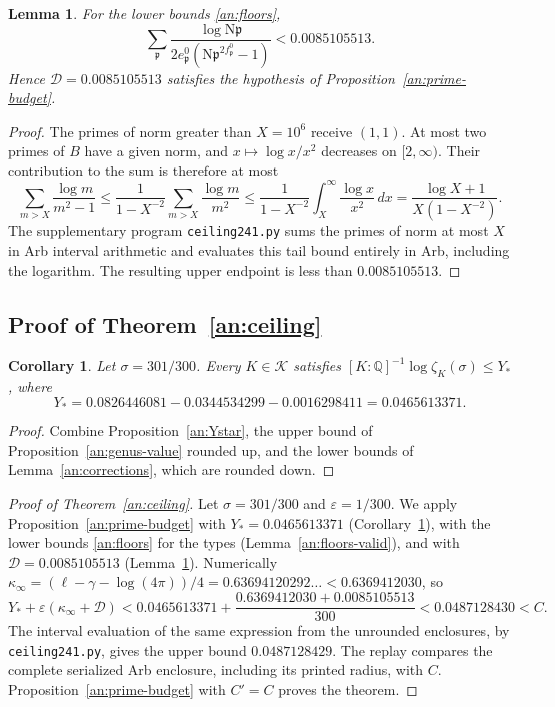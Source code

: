 \documentclass[11pt]{amsart}
\numberwithin{equation}{section}
\newtheorem{lemma}[equation]{Lemma}
\newtheorem{corollary}[equation]{Corollary}
\theoremstyle{definition}
\theoremstyle{remark}
\newcommand{\Q}{\mathbb Q}
\begin{document}
\begin{lemma}\label{an:D}
For the lower bounds \eqref{an:floors},
\begin{equation}\label{an:R}
 \sum_{\mathfrak p}\frac{\log\mathrm N\mathfrak p}
 {2e^0_{\mathfrak p}(\mathrm N\mathfrak p^{2f^0_{\mathfrak p}}-1)}
 <0.0085105513.
\end{equation}
Hence $\mathcal D=0.0085105513$ satisfies the hypothesis of
Proposition~\ref{an:prime-budget}.
\end{lemma}

\begin{proof}
The primes of norm greater than $X=10^6$ receive $(1,1)$. At most two primes
of $B$ have a given norm, and $x\mapsto\log x/x^2$ decreases on
$[2,\infty)$. Their contribution to the sum is therefore at most
\[
 \sum_{m>X}\frac{\log m}{m^2-1}
 \le\frac{1}{1-X^{-2}}\sum_{m>X}\frac{\log m}{m^2}
 \le\frac{1}{1-X^{-2}}\int_X^\infty\frac{\log x}{x^2}\,dx
 =\frac{\log X+1}{X(1-X^{-2})}.
\]
The supplementary program \texttt{ceiling241.py} sums the primes of norm at
most $X$ in Arb interval arithmetic and evaluates this tail bound entirely
in Arb, including the logarithm. The resulting upper endpoint is less
than $0.0085105513$.
\end{proof}

\subsection{\texorpdfstring{Proof of Theorem~\ref{an:ceiling}}{Proof of the Upper Bound}}

\begin{corollary}\label{an:Ystar-value}
Let $\sigma=301/300$. Every $K\in\mathcal K$ satisfies
$[K:\Q]^{-1}\log\zeta_K(\sigma)\le Y_*$, where
\[
 Y_*=0.0826446081-0.0344534299-0.0016298411=0.0465613371.
\]
\end{corollary}

\begin{proof}
Combine Proposition~\ref{an:Ystar}, the upper bound of
Proposition~\ref{an:genus-value} rounded up, and the lower bounds of
Lemma~\ref{an:corrections}, which are rounded down.
\end{proof}

\begin{proof}[Proof of Theorem~\ref{an:ceiling}]
Let $\sigma=301/300$ and $\varepsilon=1/300$. We apply
Proposition~\ref{an:prime-budget} with $Y_*=0.0465613371$
(Corollary~\ref{an:Ystar-value}), with the lower bounds \eqref{an:floors}
for the types (Lemma~\ref{an:floors-valid}), and with
$\mathcal D=0.0085105513$ (Lemma~\ref{an:D}). Numerically
$\kappa_\infty=(\ell-\gamma-\log(4\pi))/4=0.63694120292\ldots<0.6369412030$,
so
\[
 Y_*+\varepsilon(\kappa_\infty+\mathcal D)
 <0.0465613371+\frac{0.6369412030+0.0085105513}{300}
 <0.0487128430<C.
\]
The interval evaluation of the same expression from the unrounded
enclosures, by \texttt{ceiling241.py}, gives the upper bound
$0.0487128429$. The replay compares the complete serialized Arb enclosure,
including its printed radius, with $C$. Proposition~\ref{an:prime-budget} with $C'=C$ proves
the theorem.
\end{proof}
\end{document}
